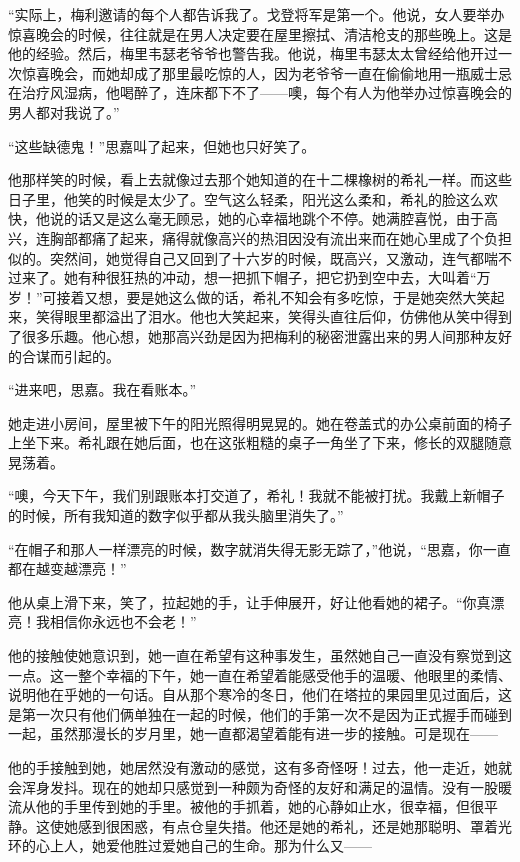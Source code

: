 \par “实际上，梅利邀请的每个人都告诉我了。戈登将军是第一个。他说，女人要举办惊喜晚会的时候，往往就是在男人决定要在屋里擦拭、清洁枪支的那些晚上。这是他的经验。然后，梅里韦瑟老爷爷也警告我。他说，梅里韦瑟太太曾经给他开过一次惊喜晚会，而她却成了那里最吃惊的人，因为老爷爷一直在偷偷地用一瓶威士忌在治疗风湿病，他喝醉了，连床都下不了——噢，每个有人为他举办过惊喜晚会的男人都对我说了。”
\par “这些缺德鬼！”思嘉叫了起来，但她也只好笑了。
\par 他那样笑的时候，看上去就像过去那个她知道的在十二棵橡树的希礼一样。而这些日子里，他笑的时候是太少了。空气这么轻柔，阳光这么柔和，希礼的脸这么欢快，他说的话又是这么毫无顾忌，她的心幸福地跳个不停。她满腔喜悦，由于高兴，连胸部都痛了起来，痛得就像高兴的热泪因没有流出来而在她心里成了个负担似的。突然间，她觉得自己又回到了十六岁的时候，既高兴，又激动，连气都喘不过来了。她有种很狂热的冲动，想一把抓下帽子，把它扔到空中去，大叫着“万岁！”可接着又想，要是她这么做的话，希礼不知会有多吃惊，于是她突然大笑起来，笑得眼里都溢出了泪水。他也大笑起来，笑得头直往后仰，仿佛他从笑中得到了很多乐趣。他心想，她那高兴劲是因为把梅利的秘密泄露出来的男人间那种友好的合谋而引起的。
\par “进来吧，思嘉。我在看账本。”
\par 她走进小房间，屋里被下午的阳光照得明晃晃的。她在卷盖式的办公桌前面的椅子上坐下来。希礼跟在她后面，也在这张粗糙的桌子一角坐了下来，修长的双腿随意晃荡着。
\par “噢，今天下午，我们别跟账本打交道了，希礼！我就不能被打扰。我戴上新帽子的时候，所有我知道的数字似乎都从我头脑里消失了。”
\par “在帽子和那人一样漂亮的时候，数字就消失得无影无踪了，”他说，“思嘉，你一直都在越变越漂亮！”
\par 他从桌上滑下来，笑了，拉起她的手，让手伸展开，好让他看她的裙子。“你真漂亮！我相信你永远也不会老！”
\par 他的接触使她意识到，她一直在希望有这种事发生，虽然她自己一直没有察觉到这一点。这一整个幸福的下午，她一直在希望着能感受他手的温暖、他眼里的柔情、说明他在乎她的一句话。自从那个寒冷的冬日，他们在塔拉的果园里见过面后，这是第一次只有他们俩单独在一起的时候，他们的手第一次不是因为正式握手而碰到一起，虽然那漫长的岁月里，她一直都渴望着能有进一步的接触。可是现在——
\par 他的手接触到她，她居然没有激动的感觉，这有多奇怪呀！过去，他一走近，她就会浑身发抖。现在的她却只感觉到一种颇为奇怪的友好和满足的温情。没有一股暖流从他的手里传到她的手里。被他的手抓着，她的心静如止水，很幸福，但很平静。这使她感到很困惑，有点仓皇失措。他还是她的希礼，还是她那聪明、罩着光环的心上人，她爱他胜过爱她自己的生命。那为什么又——
